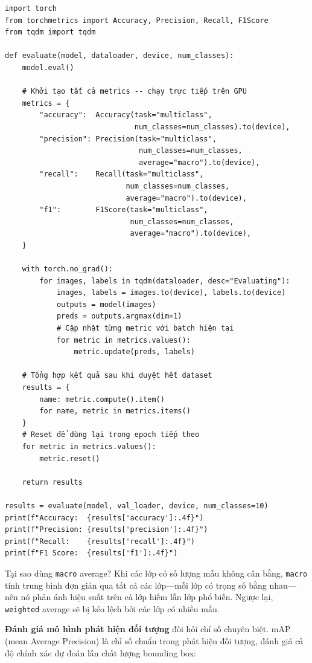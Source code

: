 \begin{verbatim}
import torch
from torchmetrics import Accuracy, Precision, Recall, F1Score
from tqdm import tqdm

def evaluate(model, dataloader, device, num_classes):
    model.eval()

    # Khởi tạo tất cả metrics -- chạy trực tiếp trên GPU
    metrics = {
        "accuracy":  Accuracy(task="multiclass",
                              num_classes=num_classes).to(device),
        "precision": Precision(task="multiclass",
                               num_classes=num_classes,
                               average="macro").to(device),
        "recall":    Recall(task="multiclass",
                            num_classes=num_classes,
                            average="macro").to(device),
        "f1":        F1Score(task="multiclass",
                             num_classes=num_classes,
                             average="macro").to(device),
    }

    with torch.no_grad():
        for images, labels in tqdm(dataloader, desc="Evaluating"):
            images, labels = images.to(device), labels.to(device)
            outputs = model(images)
            preds = outputs.argmax(dim=1)
            # Cập nhật từng metric với batch hiện tại
            for metric in metrics.values():
                metric.update(preds, labels)

    # Tổng hợp kết quả sau khi duyệt hết dataset
    results = {
        name: metric.compute().item()
        for name, metric in metrics.items()
    }
    # Reset để dùng lại trong epoch tiếp theo
    for metric in metrics.values():
        metric.reset()

    return results

results = evaluate(model, val_loader, device, num_classes=10)
print(f"Accuracy:  {results['accuracy']:.4f}")
print(f"Precision: {results['precision']:.4f}")
print(f"Recall:    {results['recall']:.4f}")
print(f"F1 Score:  {results['f1']:.4f}")
\end{verbatim}

Tại sao dùng \texttt{macro} average? Khi các lớp có số lượng mẫu không cân bằng, \texttt{macro} tính trung bình đơn giản qua tất cả các lớp---mỗi lớp có trọng số bằng nhau---nên nó phản ánh hiệu suất trên cả lớp hiếm lẫn lớp phổ biến. Ngược lại, \texttt{weighted} average sẽ bị kéo lệch bởi các lớp có nhiều mẫu.

\vspace{0.5em}
\textbf{Đánh giá mô hình phát hiện đối tượng} đòi hỏi chỉ số chuyên biệt. mAP (mean Average Precision) là chỉ số chuẩn trong phát hiện đối tượng, đánh giá cả độ chính xác dự đoán lẫn chất lượng bounding box:

